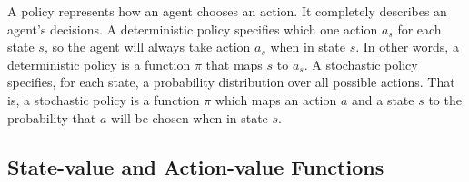 \documentclass{article}
\begin{document}
A policy represents how an agent chooses an action. It completely describes an agent’s decisions. A deterministic policy specifies which one action $a_s$ for each state $s$, so the agent will always take action $a_s$ when in state $s$. In other words, a deterministic policy is a function $\pi$ that maps $s$ to $a_s$. A stochastic policy specifies, for each state, a probability distribution over all possible actions. That is, a stochastic policy is a function $\pi$ which maps an action $a$ and a state $s$ to the probability that $a$ will be chosen when in state $s$.

\subsection{State-value and Action-value Functions}
\end{document}
